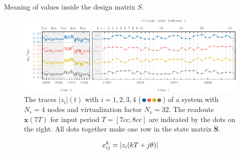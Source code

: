Meaning of values inside the design matrix $S$.


\begin{figure}
	\centering
	\includegraphics[width=15cm]{pics/driven_ts_statematrix}
	\caption{The traces $|z_{i}|(t)$ with $i=1,2,3,4$ ($\textcolor{myblue}{\sbullet[1.5]}\textcolor{myred}{\sbullet[1.5]}\textcolor{myyellow}{\sbullet[1.5]}\textcolor{mybrown}{\sbullet[1.5]}$) of a system with $N_{r}=4$ nodes and virtualization factor $N_{v}=32$. The readouts $\textbf{x}(7T)$ for input period $T=[7cc,8cc]$ are indicated by the dots on the right. All dots together make one row in the state matrix $\textbf{S}$.}
	\label{fig:ts_vn_for_statematrix}
\end{figure}


\begin{equation}
x_{ij}^{k} = |z_{i}(k T + j\theta)|\\
\end{equation}

